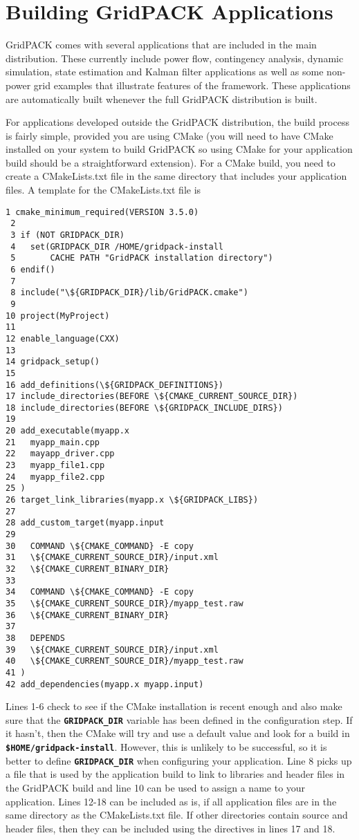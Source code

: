 \chapter{Building GridPACK Applications}

GridPACK comes with several applications that are included in the main distribution. These currently include power flow, contingency analysis, dynamic simulation, state estimation and Kalman filter applications as well as some non-power grid examples that illustrate features of the framework. These applications are automatically built whenever the full GridPACK distribution is built. 

For applications developed outside the GridPACK distribution, the build process is fairly simple, provided you are using CMake (you will need to have CMake installed on your system to build GridPACK so using CMake for your application build should be a straightforward extension). For a CMake build, you need to create a CMakeLists.txt file in the same directory that includes your application files. A template for the CMakeLists.txt file is

{
\color{red}
\begin{Verbatim}[fontseries=b]
 1 cmake_minimum_required(VERSION 3.5.0)
 2
 3 if (NOT GRIDPACK_DIR)
 4   set(GRIDPACK_DIR /HOME/gridpack-install
 5       CACHE PATH "GridPACK installation directory")
 6 endif()
 7
 8 include("\${GRIDPACK_DIR}/lib/GridPACK.cmake")
 9
10 project(MyProject)
11
12 enable_language(CXX)
13
14 gridpack_setup()
15
16 add_definitions(\${GRIDPACK_DEFINITIONS})
17 include_directories(BEFORE \${CMAKE_CURRENT_SOURCE_DIR})
18 include_directories(BEFORE \${GRIDPACK_INCLUDE_DIRS})
19
20 add_executable(myapp.x
21   myapp_main.cpp
22   mayapp_driver.cpp
23   myapp_file1.cpp
24   myapp_file2.cpp
25 )
26 target_link_libraries(myapp.x \${GRIDPACK_LIBS})
27 
28 add_custom_target(myapp.input
29 
30   COMMAND \${CMAKE_COMMAND} -E copy 
31   \${CMAKE_CURRENT_SOURCE_DIR}/input.xml
32   \${CMAKE_CURRENT_BINARY_DIR}
33 
34   COMMAND \${CMAKE_COMMAND} -E copy 
35   \${CMAKE_CURRENT_SOURCE_DIR}/myapp_test.raw
36   \${CMAKE_CURRENT_BINARY_DIR}
37 
38   DEPENDS 
39   \${CMAKE_CURRENT_SOURCE_DIR}/input.xml
40   \${CMAKE_CURRENT_SOURCE_DIR}/myapp_test.raw
41 )
42 add_dependencies(myapp.x myapp.input)
\end{Verbatim}
}

Lines 1-6 check to see if the CMake installation is recent enough and also make sure that the \texttt{\textbf{GRIDPACK\_DIR}} variable has been defined in the configuration step. If it hasn't, then the CMake will try and use a default value and look for a build in\texttt{\textbf{ \$HOME/gridpack-install}}. However, this is unlikely to be successful, so it is better to define \texttt{\textbf{GRIDPACK\_DIR}} when configuring your application. Line 8 picks up a file that is used by the application build to link to libraries and header files in the GridPACK build and line 10 can be used to assign a name to your application. Lines 12-18 can be included as is, if all application files are in the same directory as the CMakeLists.txt file. If other directories contain source and header files, then they can be included using the directives in lines 17 and 18.

